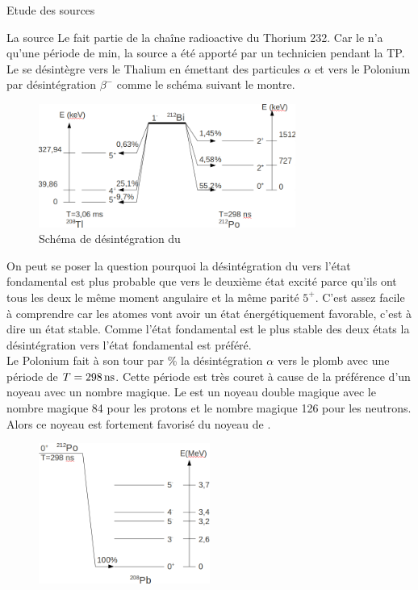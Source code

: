 \documentclass[a4paper,11pt]{scrartcl}
\begin{document}
\begin{section}{Etude des sources}
  \begin{subsection}{La source }
   Le  fait partie de la chaîne radioactive du Thorium 232. Car le   n'a qu'une période de \unit[60,5]{min}, la source a été apporté par un technicien pendant la TP. Le  se désintègre vers le Thalium  en émettant des particules $\alpha$  et vers le Polonium par désintégration $\beta^-$ comme le schéma suivant le montre.\\
   \begin{figure}[H]
    \begin{center}
     \includegraphics[width=0.75\textwidth]{Bilder/schemaBi1.png}
    \end{center}
    \caption{Schéma de désintégration du  }
   \end{figure}
   On peut se poser la question pourquoi la désintégration du  vers l'état fondamental est plus probable que vers le deuxième état excité parce qu'ils ont tous les deux le même moment angulaire et la même parité $5^+$. C'est assez facile à comprendre car les atomes vont avoir un état énergétiquement favorable, c'est à dire un état stable. Comme l'état fondamental est le plus stable des deux états la désintégration vers l'état fondamental est préféré.\\
\newpage
   Le Polonium  fait à son tour par \unit[100]{\%} la désintégration $\alpha$ vers le plomb  avec une période de $T=\unit[298]{ns}$. Cette période est très couret à cause de la préférence d'un noyeau avec un nombre magique. Le  est un noyeau double magique avec le nombre magique 84 pour les protons et le nombre magique 126 pour les neutrons. Alors ce noyeau est fortement favorisé du noyeau de .
   \begin{figure}[H]
    \begin{center}
     \includegraphics[width=0.5\textwidth]{Bilder/schemaPo1.png}

\end{center}
\end{figure}
\end{subsection}
\end{section}
\end{document}
